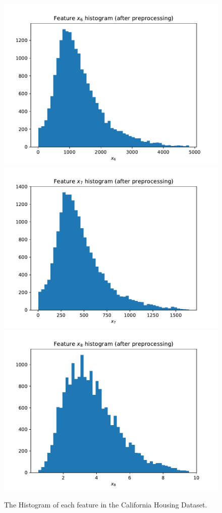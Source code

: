 \documentclass[twoside]{article}
\begin{document}
\begin{figure}[h]
  \includegraphics[width=.43\textwidth]{real_dataset_3/hist_feat_6_after.pdf}\\
  \includegraphics[width=.43\textwidth]{real_dataset_3/hist_feat_7_after.pdf}
  \includegraphics[width=.43\textwidth]{real_dataset_3/hist_feat_8_after.pdf}\\
  \label{fig:feature-histograms}
  \caption{The Histogram of each feature in the California Housing Dataset.}
\end{figure}
\end{document}
